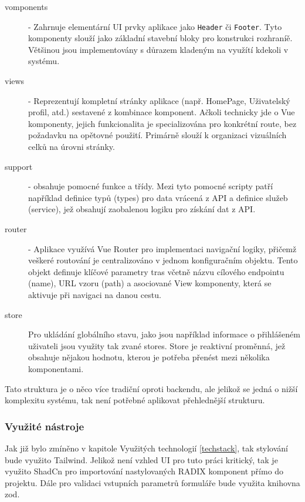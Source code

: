 \begin{description}
    \item[vomponents] - Zahrnuje elementární UI prvky aplikace jako \texttt{Header} či \texttt{Footer}. Tyto komponenty slouží jako základní stavební bloky pro konstrukci rozhraníě. Většinou jsou implementovány s důrazem kladeným na využítí kdekoli v systému.
    \item[views] - Reprezentují kompletní stránky aplikace (např. HomePage, Uživatelský profil, atd.) sestavené z kombinace komponent. Ačkoli technicky jde o Vue komponenty, jejich funkcionalita je specializována pro konkrétní route, bez požadavku na opětovné použití. Primárně slouží k organizaci vizuálních celků na úrovni stránky.
    \item[support] - obsahuje pomocné funkce a třídy. Mezi tyto pomocné scripty patří například definice typů (types) pro data vrácená z API a definice služeb (service), jež obsahují zaobalenou logiku pro získání dat z API.
    \item[router] - Aplikace využívá Vue Router pro implementaci navigační logiky, přičemž veškeré routování je centralizováno v jednom konfiguračním objektu. Tento objekt definuje klíčové parametry tras včetně názvu cílového endpointu (name), URL vzoru (path) a asociované View komponenty, která se aktivuje při navigaci na danou cestu.

    \item[store]
    Pro ukládání globálního stavu, jako jsou například informace o přihlášeném uživateli jsou využity tak zvané stores. Store je reaktivní proměnná, jež obsahuje nějakou hodnotu, kterou je potřeba přenést mezi několika komponentami.
\end{description}

Tato struktura je o něco více tradiční oproti backendu, ale jelikož se jedná o nižší komplexitu systému, tak není potřebné aplikovat přehlednější strukturu.

\subsubsection{Využité nástroje}
Jak již bylo zmíněno v kapitole Využitých technologií \ref{techstack}, tak stylování bude využito Tailwind. Jelikož není vzhled UI pro tuto práci kritický, tak je využito ShadCn pro importování nastylovaných RADIX komponent přímo do projektu. Dále pro validaci vstupních parametrů formuláře bude využita knihovna zod.


